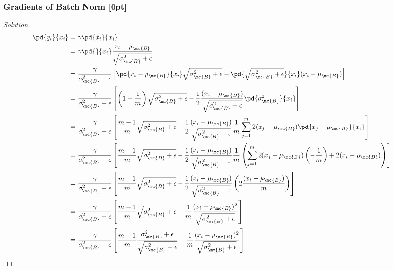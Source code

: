 \documentclass{article}
\begin{document}
	\subsubsection{Gradients of Batch Norm [0pt]}
	\begin{proof}[Solution]
		\begin{align}
			\pd{y_i}{x_i} &= \gamma \pd{\hat{x}_i}{x_i} \\
			&= \gamma \pd{}{x_i} \frac{x_i - \mu_\mc{B}}{\sqrt{\sigma_\mc{B}^2 + \epsilon}} \\
			&= \frac{\gamma}{\sigma_\mc{B}^2 + \epsilon} \left[
			\pd{x_i - \mu_\mc{B}}{x_i}\sqrt{\sigma_\mc{B}^2 + \epsilon}
			- \pd{\sqrt{\sigma_\mc{B}^2 + \epsilon}}{x_i}(x_i - \mu_\mc{B})
			\right] \\
			&= \frac{\gamma}{\sigma_\mc{B}^2 + \epsilon} \left[
			\left(1 - \frac{1}{m}\right)
			\sqrt{\sigma_\mc{B}^2 + \epsilon}
			- \frac{1}{2} \frac{(x_i - \mu_\mc{B})}{\sqrt{\sigma_\mc{B}^2 + \epsilon}} \pd{\sigma_\mc{B}^2}{x_i}
			\right] \\
			&= \frac{\gamma}{\sigma_\mc{B}^2 + \epsilon} \left[
			\frac{m-1}{m}
			\sqrt{\sigma_\mc{B}^2 + \epsilon}
			- \frac{1}{2} \frac{(x_i - \mu_\mc{B})}{\sqrt{\sigma_\mc{B}^2 + \epsilon}}
			\frac{1}{m} \sum_{j=1}^m 2 (x_j - \mu_\mc{B}) \pd{x_j - \mu_\mc{B}}{x_i}
			\right] \\
			&=\frac{\gamma}{\sigma_\mc{B}^2 + \epsilon} \left[
			\frac{m-1}{m}
			\sqrt{\sigma_\mc{B}^2 + \epsilon}
			- \frac{1}{2} \frac{(x_i - \mu_\mc{B})}{\sqrt{\sigma_\mc{B}^2 + \epsilon}}
			\frac{1}{m} \left( \sum_{j=1}^m 2(x_j - \mu_\mc{B}) \left(- \frac{1}{m}\right)
			+ 2 (x_i - \mu_\mc{B})
			\right)
			\right] \\
			&=\frac{\gamma}{\sigma_\mc{B}^2 + \epsilon} \left[
			\frac{m-1}{m}
			\sqrt{\sigma_\mc{B}^2 + \epsilon}
			- \frac{1}{2} \frac{(x_i - \mu_\mc{B})}{\sqrt{\sigma_\mc{B}^2 + \epsilon}}
			\left(
			2 \frac{(x_i - \mu_\mc{B})}{m}
			\right)
			\right] \\
			&=\frac{\gamma}{\sigma_\mc{B}^2 + \epsilon} \left[
			\frac{m-1}{m}
			\sqrt{\sigma_\mc{B}^2 + \epsilon}
			- \frac{1}{m} \frac{(x_i - \mu_\mc{B})^2}{\sqrt{\sigma_\mc{B}^2 + \epsilon}}
			\right] \\
			&=\frac{\gamma}{\sigma_\mc{B}^2 + \epsilon} \left[
			\frac{m-1}{m}
			\frac{\sigma_\mc{B}^2 + \epsilon}{\sqrt{\sigma_\mc{B}^2 + \epsilon}}
			- \frac{1}{m} \frac{(x_i - \mu_\mc{B})^2}{\sqrt{\sigma_\mc{B}^2 + \epsilon}}
			\right]
		\end{align}
	\end{proof}
	
\end{document}
